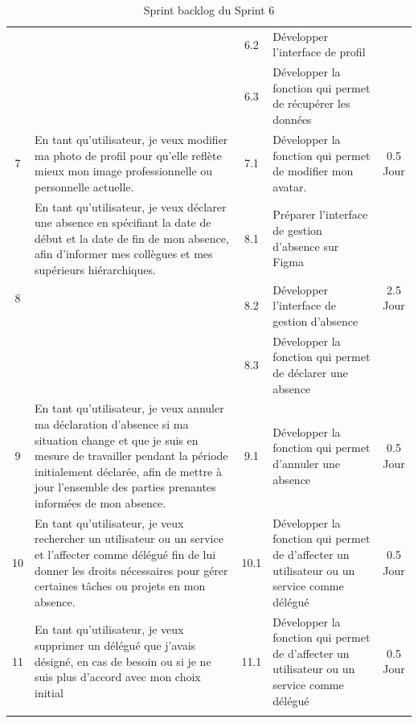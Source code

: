 \begin{adjustwidth}{-1cm}{}
\begin{longtable}{|c|p{6cm}|c|p{6cm}|c|}
      \cline{3-4}
      & & 6.2 & Développer l'interface de profil & \\
      \cline{3-4}
      & & 6.3 & Développer la fonction qui permet de récupérer les données & \\
      \cline{1-5}
      \multirow{1}{*}{7} & En tant qu'utilisateur, je veux modifier ma photo de profil pour qu'elle reflète mieux mon image professionnelle ou personnelle actuelle.& 7.1 & Développer la fonction qui permet de modifier mon avatar. & \multirow{1}{*}{0.5 Jour} \\
      \cline{1-5}
      \multirow{3}{*}{8} & En tant qu'utilisateur, je veux déclarer une absence en spécifiant la date de début et la date de fin de mon absence, afin d'informer mes collègues et mes supérieurs hiérarchiques.& 8.1 & Préparer l'interface de gestion d'absence sur Figma & \multirow{3}{*}{2.5 Jour} \\
      \cline{3-4}
      & & 8.2 & Développer l'interface de gestion d'absence & \\
      \cline{3-4}
      & & 8.3 & Développer la fonction qui permet de déclarer une absence & \\
      \cline{1-5}
      \multirow{1}{*}{9} & En tant qu'utilisateur, je veux annuler ma déclaration d'absence si ma situation change et que je suis en mesure de travailler pendant la période initialement déclarée, afin de mettre à jour l'ensemble des parties prenantes informées de mon absence. & 9.1 & Développer la fonction qui permet d'annuler une absence & \multirow{1}{*}{0.5 Jour} \\
      \cline{1-5}
      \multirow{1}{*}{10} & En tant qu'utilisateur, je veux rechercher un utilisateur ou un service et l'affecter comme délégué fin de lui donner les droits nécessaires pour gérer certaines tâches ou projets en mon absence. & 10.1 & Développer la fonction qui permet de d'affecter un utilisateur ou un service comme délégué   & \multirow{1}{*}{0.5 Jour} \\
      \cline{1-5}
      \multirow{1}{*}{11} & En tant qu'utilisateur, je veux supprimer un délégué que j'avais désigné, en cas de besoin ou si je ne suis plus d'accord avec mon choix initial & 11.1 & Développer la fonction qui permet de d'affecter un utilisateur ou un service comme délégué   & \multirow{1}{*}{0.5 Jour} \\
    \hline
  \caption{Sprint backlog du Sprint 6}
  \label{tab:sprint-backlog-6}
\end{longtable}
\end{adjustwidth}


